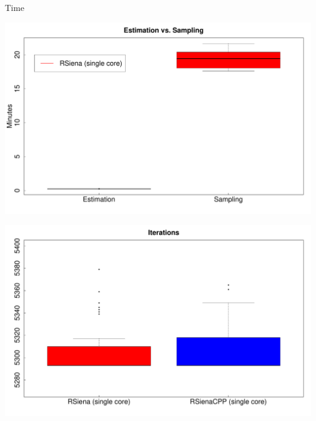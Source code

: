 \documentclass[]{beamer}                                                %
\begin{document}
\begin{frame}{Time}                                                     %
  \begin{center}
    \includegraphics[width=\textwidth]{estimation-vs-simulation}
  \end{center}
\end{frame}
\begin{frame}%
  \begin{center}
    \includegraphics[width=\textwidth]{iterations}
  \end{center}
\end{frame}
\end{document}
